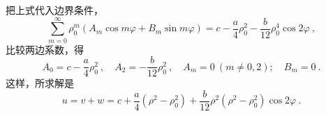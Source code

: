 \begin{example}{}
把上式代入边界条件，
\begin{equation}
    \sum_{m=0}^{\infty} \rho_{0}^{m}\left(A_{m} \cos m \varphi+B_{m} \sin m \varphi\right)=c-\frac{a}{4} \rho_{0}^{2}-\frac{b}{12} \rho_{0}^{4} \cos 2 \varphi~,
\end{equation}
比较两边系数，得
\begin{equation}
    A_{0}=c-\frac{a}{4} \rho_{0}^{2}~,\quad A_{2}=-\frac{b}{12} \rho_{0}^{2}~,\quad A_{m}=0\ (m \neq 0,2) ;\quad B_{m}=0~.
\end{equation}
这样，所求解是
\begin{equation}
    u=v+w=c+\frac{a}{4}\left(\rho^{2}-\rho_{0}^{2}\right)+\frac{b}{12} \rho^{2}\left(\rho^{2}-\rho_{0}^{2}\right) \cos 2 \varphi~.
\end{equation}
\end{example}

